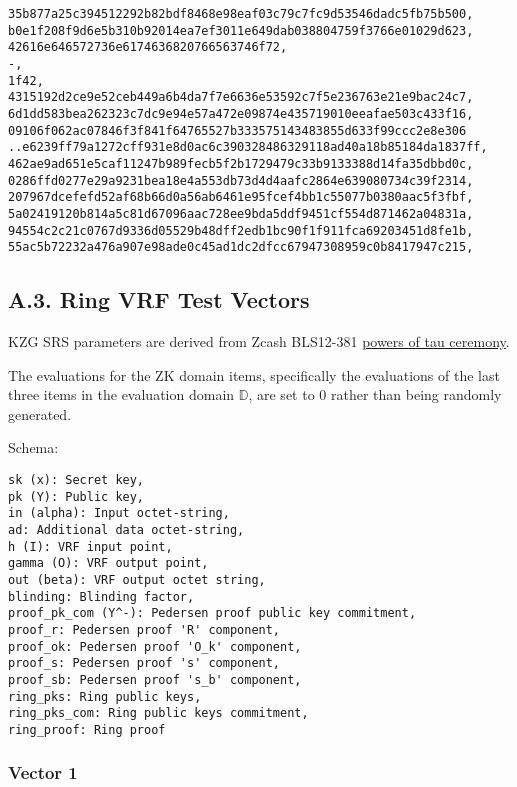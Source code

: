 \documentclass[
]{article}
\begin{document}
\begin{verbatim}
35b877a25c394512292b82bdf8468e98eaf03c79c7fc9d53546dadc5fb75b500,
b0e1f208f9d6e5b310b92014ea7ef3011e649dab038804759f3766e01029d623,
42616e646572736e6174636820766563746f72,
-,
1f42,
4315192d2ce9e52ceb449a6b4da7f7e6636e53592c7f5e236763e21e9bac24c7,
6d1dd583bea262323c7dc9e94e57a472e09874e435719010eeafae503c433f16,
09106f062ac07846f3f841f64765527b333575143483855d633f99ccc2e8e306
..e6239ff79a1272cff931e8d0ac6c390328486329118ad40a18b85184da1837ff,
462ae9ad651e5caf11247b989fecb5f2b1729479c33b9133388d14fa35dbbd0c,
0286ffd0277e29a9231bea18e4a553db73d4d4aafc2864e639080734c39f2314,
207967dcefefd52af68b66d0a56ab6461e95fcef4bb1c55077b0380aac5f3fbf,
5a02419120b814a5c81d67096aac728ee9bda5ddf9451cf554d871462a04831a,
94554c2c21c0767d9336d05529b48dff2edb1bc90f1f911fca69203451d8fe1b,
55ac5b72232a476a907e98ade0c45ad1dc2dfcc67947308959c0b8417947c215,
\end{verbatim}

\hypertarget{a.3.-ring-vrf-test-vectors}{%
\subsection{A.3. Ring VRF Test
Vectors}\label{a.3.-ring-vrf-test-vectors}}

KZG SRS parameters are derived from Zcash BLS12-381
\href{https://zfnd.org/conclusion-of-the-powers-of-tau-ceremony}{powers
of tau ceremony}.

The evaluations for the ZK domain items, specifically the evaluations of
the last three items in the evaluation domain \(\mathbb{D}\), are set to
0 rather than being randomly generated.

Schema:

\begin{verbatim}
sk (x): Secret key,
pk (Y): Public key,
in (alpha): Input octet-string,
ad: Additional data octet-string,
h (I): VRF input point,
gamma (O): VRF output point,
out (beta): VRF output octet string,
blinding: Blinding factor,
proof_pk_com (Y^-): Pedersen proof public key commitment,
proof_r: Pedersen proof 'R' component,
proof_ok: Pedersen proof 'O_k' component,
proof_s: Pedersen proof 's' component,
proof_sb: Pedersen proof 's_b' component,
ring_pks: Ring public keys,
ring_pks_com: Ring public keys commitment,
ring_proof: Ring proof
\end{verbatim}

\hypertarget{vector-1-2}{%
\subsubsection{Vector 1}\label{vector-1-2}}
\end{document}
